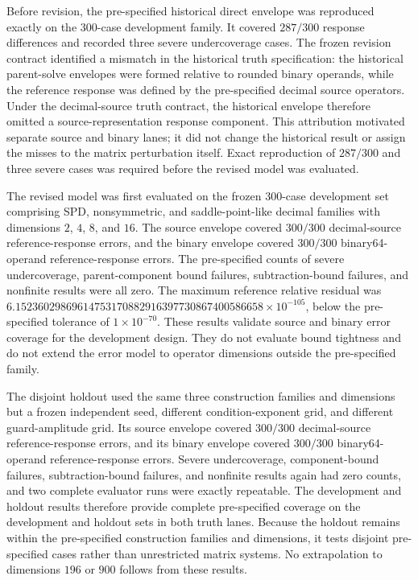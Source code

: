 \documentclass[preprint,12pt]{elsarticle}
\begin{document}
Before revision, the pre-specified historical direct envelope was reproduced exactly on the 300-case development family. It covered $287/300$ response differences and recorded three severe undercoverage cases. The frozen revision contract identified a mismatch in the historical truth specification: the historical parent-solve envelopes were formed relative to rounded binary operands, while the reference response was defined by the pre-specified decimal source operators. Under the decimal-source truth contract, the historical envelope therefore omitted a source-representation response component. This attribution motivated separate source and binary lanes; it did not change the historical result or assign the misses to the matrix perturbation itself. Exact reproduction of $287/300$ and three severe cases was required before the revised model was evaluated.

The revised model was first evaluated on the frozen 300-case development set comprising SPD, nonsymmetric, and saddle-point-like decimal families with dimensions $2$, $4$, $8$, and $16$. The source envelope covered $300/300$ decimal-source reference-response errors, and the binary envelope covered $300/300$ binary64-operand reference-response errors. The pre-specified counts of severe undercoverage, parent-component bound failures, subtraction-bound failures, and nonfinite results were all zero. The maximum reference relative residual was $6.15236029869614753170882916397730867400586658\allowbreak\times10^{-105}$, below the pre-specified tolerance of $1\allowbreak\times10^{-70}$. These results validate source and binary error coverage for the development design. They do not evaluate bound tightness and do not extend the error model to operator dimensions outside the pre-specified family.

The disjoint holdout used the same three construction families and dimensions but a frozen independent seed, different condition-exponent grid, and different guard-amplitude grid. Its source envelope covered $300/300$ decimal-source reference-response errors, and its binary envelope covered $300/300$ binary64-operand reference-response errors. Severe undercoverage, component-bound failures, subtraction-bound failures, and nonfinite results again had zero counts, and two complete evaluator runs were exactly repeatable. The development and holdout results therefore provide complete pre-specified coverage on the development and holdout sets in both truth lanes. Because the holdout remains within the pre-specified construction families and dimensions, it tests disjoint pre-specified cases rather than unrestricted matrix systems. No extrapolation to dimensions $196$ or $900$ follows from these results.
\end{document}
